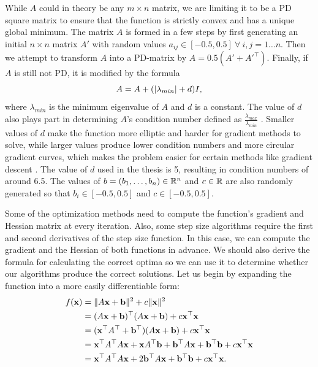 \documentclass[english, 12pt, a4paper, sci, utf8, a-1b, online, table]{aaltothesis}
\newcommand{\vect}[1]{\ensuremath{\mathbf{#1}}}
\newcommand{\trans}[1]{\ensuremath\vect{#1}^\top}
\newcommand{\norm}[1]{\ensuremath\Vert #1 \Vert}
\newcommand{\abs}[1]{\ensuremath|#1|}
\newcommand{\R}{\ensuremath\mathbb{R}}
\begin{document}
While $A$ could in theory be any $m \times n$ matrix, we are limiting it to be a PD square matrix to ensure that the function is strictly convex and has a unique global minimum. The matrix $A$ is formed in a few steps by first generating an initial $n \times n$ matrix $A'$ with random values $a_{ij} \in [-0.5, 0.5]\ \forall\ i,j = 1 \dots n$. Then we attempt to transform $A$ into a PD-matrix by $A = 0.5 (A' + A'^\top)$. Finally, if  $A$ is still not PD, it is modified by the formula 
\begin{equation}
    A = A + (\abs{\lambda_{min}} + d) I,
\end{equation}
where $\lambda_{min}$ is the minimum eigenvalue of $A$ and $d$ is a constant. The value of $d$ also plays part in determining $A$'s condition number defined as $\frac{\lambda_{max}}{\lambda_{min}}$ \cite{book:numberical_linear_algebra}. Smaller values of $d$ make the function more elliptic and harder for gradient methods to solve, while larger values produce lower condition numbers and more circular gradient curves, which makes the problem easier for certain methods like gradient descent \cite{book:introduction_continuous_optimization}. The value of $d$ used in the thesis is 5, resulting in condition numbers of around 6.5.
The values of $b = (b_1,\dots,b_n) \in \R^n$ and $c\in \R$ are also randomly generated so that $b_i \in [-0.5, 0.5]$ and $c \in [-0.5, 0.5]$.

Some of the optimization methods need to compute the function's gradient and Hessian matrix at every iteration. Also, some step size algorithms require the first and second derivatives of the step size function. In this case, we can compute the gradient and the Hessian of both functions in advance. 
We should also derive the formula for calculating the correct optima so we can use it to determine whether our algorithms produce the correct solutions. Let us begin by expanding the function into a more easily differentiable form:
\begin{align*}
    f(\vect{x}) &= \norm{A \vect{x} + \vect{b}} ^ 2 + c \norm{\vect{x}} ^ 2 \\
               &= (A \vect{x} + \vect{b})^\top(A \vect{x} + \vect{b}) + c \trans{x} \vect{x} \\
               &= (\trans{x} A^\top + \trans{b})(A\vect{x} + \vect{b}) + c \trans{x} \vect{x} \\
               &= \trans{x} A^\top A \vect{x} + \vect{x} A^\top \vect{b} + \trans{b} A \vect{x} + \trans{b} \vect{b} + c \trans{x} \vect{x} \\
               &= \trans{x} A^\top A \vect{x} + 2 \trans{b} A \vect{x} + \trans{b} \vect{b} + c \trans{x} \vect{x}.
\end{align*}
\end{document}
